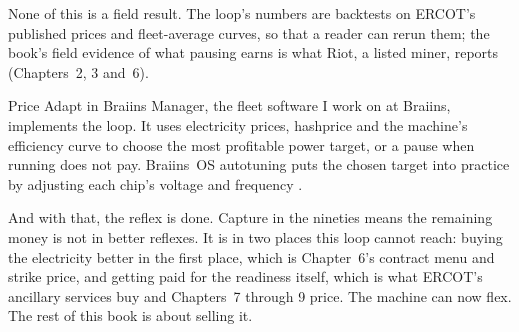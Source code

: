 None of this is a field result. The loop's numbers are backtests on ERCOT's published prices and fleet-average curves, so that a reader can rerun them; the book's field evidence of what pausing earns is what Riot, a listed miner, reports (Chapters~2, 3 and~6). %

Price Adapt in Braiins Manager, the fleet software I work on at Braiins, implements the loop. It uses electricity prices, hashprice and the machine's efficiency curve to choose the most profitable power target, or a pause when running does not pay. Braiins~OS autotuning puts the chosen target into practice by adjusting each chip's voltage and frequency \autocite{braiinsacademypriceadapt,braiinsacademyautotuning}. %

And with that, the reflex is done. Capture in the nineties means the remaining money is not in better reflexes. It is in two places this loop cannot reach: buying the electricity better in the first place, which is Chapter~6's contract menu and strike price, and getting paid for the readiness itself, which is what ERCOT's ancillary services buy and Chapters~7 through 9 price. The machine can now flex. The rest of this book is about selling it.
